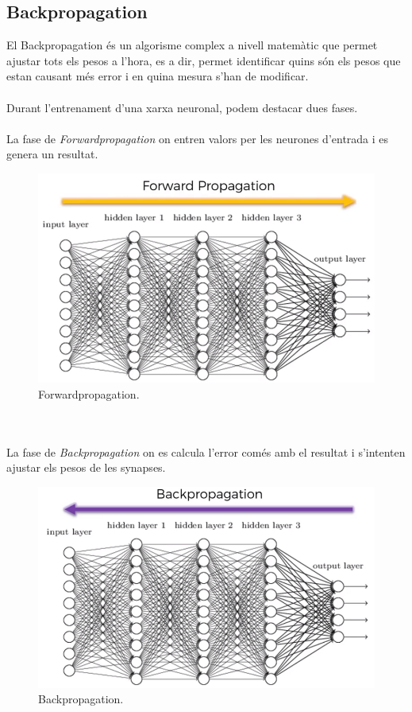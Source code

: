 \documentclass[12pt]{article}
\begin{document}
\clearpage
\subsection{Backpropagation\label{bp}}
El Backpropagation és un algorisme complex a nivell matemàtic que permet ajustar tots els pesos a l'hora, es a dir, permet identificar quins són els pesos que estan causant més error i en quina mesura s'han de modificar.
\\\\Durant l'entrenament d'una xarxa neuronal, podem destacar dues fases.
\\\\La fase de \textit{Forwardpropagation} on entren valors per les neurones d'entrada i es genera un resultat.
\begin{figure}[h!]
	\centering
	\includegraphics[scale=0.25]{imatges/bp/1bp.png}
	\caption{Forwardpropagation.}
\end{figure}
\\\\La fase de \textit{Backpropagation} on es calcula l'error comés amb el resultat i s'intenten ajustar els pesos de les synapses.
\begin{figure}[h!]
	\centering
	\includegraphics[scale=0.25]{imatges/bp/2bp.png}
	\caption{Backpropagation.}
\end{figure}
\end{document}
